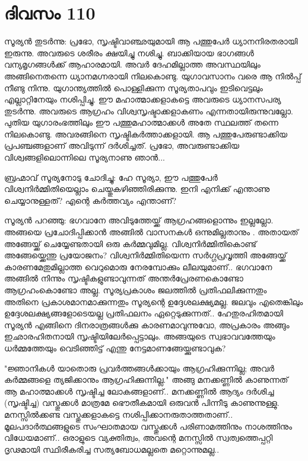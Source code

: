 \newpage
\section{ദിവസം 110}


സൂര്യന്‍ തുടര്‍ന്നു: പ്രഭോ,  സൃഷ്ടിവാഞ്ഛയുമായി ആ പത്തുപേര്‍ ധ്യാനനിരതരായി ഇരുന്നു. അവരുടെ ശരീരം ക്ഷയിച്ചു നശിച്ചു. ബാക്കിയായ ഭാഗങ്ങള്‍ വന്യമൃഗങ്ങള്‍ക്ക്‌ ആഹാരമായി. അവര്‍ ദേഹമില്ലാത്ത അവസ്ഥയിലും അങ്ങിനെതന്നെ ധ്യാനമഗ്നരായി നിലകൊണ്ടു.  യുഗാവസാനം വരെ  ആ നില്‍പ്പ്‌ നീണ്ടു നിന്നു. യുഗാന്ത്യത്തില്‍ പൊള്ളിക്കുന്ന സൂര്യതാപവും ഇടിവെട്ടലും എല്ലാറ്റിനേയും നശിപ്പിച്ചു. ഈ മഹാത്മാക്കളാകട്ടെ അവരുടെ ധ്യാനസപര്യ തുടര്‍ന്നു. അവരുടെ ആഗ്രഹം വിശ്വസൃഷ്ടാക്കളാകണം എന്നതായിരുന്നുവല്ലോ. പുതിയ യുഗാരംഭത്തിലും ഈ പത്തുമഹാത്മാക്കള്‍ അതേ സ്ഥലത്ത്‌ തന്നെ നിലകൊണ്ടു. അവരങ്ങിനെ സൃഷ്ടികര്‍ത്താക്കളായി. ആ പത്തുപേരുണ്ടാക്കിയ പ്രപഞ്ചങ്ങളാണ്‌ അവിടുന്ന് ദര്‍ശിച്ചത്‌. പ്രഭോ, അവരുണ്ടാക്കിയ വിശ്വങ്ങളിലൊന്നിലെ സൂര്യനാണു ഞാന്‍...

ബ്രഹ്മാവ്‌ സൂര്യനോടു ചോദിച്ചു: ഹേ സൂര്യാ, ഈ പത്തുപേര്‍ വിശ്വനിര്‍മ്മിതിയെല്ലാം ചെയ്തുകഴിഞ്ഞിരിക്കുന്നു. ഇനി എനിക്ക്‌ എന്താണു ചെയ്യാനുള്ളത്‌? എന്റെ കര്‍ത്തവ്യം എന്താണ്‌?

സൂര്യന്‍ പറഞ്ഞു: ഭഗവാനേ അവിടുത്തേയ്ക്ക്‌ ആഗ്രഹങ്ങളൊന്നും ഇല്ലല്ലോ. അങ്ങയെ പ്രചോദിപ്പിക്കാന്‍  അങ്ങില്‍ വാസനകള്‍ ഒന്നുമില്ലതാനും . അതായത്‌ അങ്ങേയ്ക്ക്‌ ചെയ്യേണ്ടതായി ഒരു കര്‍മ്മവുമില്ല. വിശ്വനിര്‍മ്മിതികൊണ്ട്‌ അങ്ങേയ്ക്കെന്തു പ്രയോജനം? വിശ്വനിര്‍മ്മിതിയെന്ന സര്‍ഗ്ഗപ്രവൃത്തി അങ്ങേയ്ക്ക്‌ കാരണമേതുമില്ലാത്ത വെറുമൊരു നേരമ്പോക്കും ലീലയുമാണ്‌.. ഭഗവാനേ അങ്ങില്‍ നിന്നും സൃഷ്ടികളുണ്ടാവുന്നത്‌ അന്തര്‍പ്രേരണകൊണ്ടോ ആഗ്രഹംകൊണ്ടോ അല്ല. സൂര്യപ്രകാശം ജലത്തില്‍ പ്രതിഫലിക്കുന്നതും അതിനെ പ്രകാശമാനമാക്കുന്നതും സൂര്യന്റെ ഉദ്ദേശലക്ഷ്യമല്ല. ജലവും എതെങ്കിലും ഉദ്ദേശലക്ഷ്യങ്ങളോടെയല്ല പ്രതിഫലനം ഏറ്റെടുക്കുന്നത്‌.. ഹേതുരഹിതമായി സൂര്യന്‍ എങ്ങിനെ ദിനരാത്രങ്ങള്‍ക്കു കാരണമാവുന്നുവോ, അപ്രകാരം അങ്ങും ഇഛാരഹിതനായി സൃഷ്ടിയിലേര്‍പ്പെട്ടാലും. അങ്ങയുടെ സ്വഭാവവത്തേയും ധര്‍മ്മത്തേയും വെടിഞ്ഞിട്ട്‌ എന്തു നേട്ടമാണങ്ങേയ്ക്കുണ്ടാവുക?

"ജ്ഞാനികള്‍ യാതൊരു പ്രവര്‍ത്തങ്ങള്‍ക്കായും ആഗ്രഹിക്കുന്നില്ല; അവര്‍ കര്‍മ്മങ്ങളെ ത്യജിക്കാനും ആഗ്രഹിക്കുന്നില്ല." അങ്ങു മനക്കണ്ണില്‍ കാണുന്നത്‌ ആ മഹാത്മാക്കള്‍ സൃഷ്ടിച്ച ലോകങ്ങളാണ്‌.. മനക്കണ്ണില്‍ ആദ്യം ദര്‍ശിച്ച (സൃഷ്ടിച്ച) വസ്തുക്കള്‍ മാത്രമേ ഭൌതീകമായി ഒരുവന്‍ പിന്നീടു കാണുന്നുള്ളു. മനസ്സില്‍ക്കണ്ട വസ്തുക്കളാകട്ടെ നശിപ്പിക്കാനരുതാത്തതാണ്‌.. മൂലപദാര്‍ത്ഥങ്ങളുടെ സംഘാതമായ വസ്തുക്കള്‍ പരിണാമത്തിനും നാശത്തിനും വിധേയമാണ്‌.. ഒരാളുടെ വ്യക്തിത്വം, അവന്റെ മനസ്സില്‍ സ്വത്വത്തെപ്പറ്റി ദൃഢമായി സ്ഥിരീകരിച്ച സത്യബോധമല്ലതെ മറ്റൊന്നുമല്ല..

